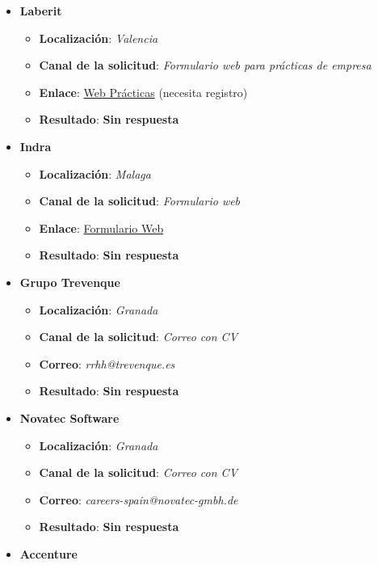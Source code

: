 \begin{itemize}
\begin{itemize}
	\end{itemize}
	\item \textbf{Laberit}
	\begin{itemize}
		\item \textbf{Localización}: \textit{Valencia}
		\item \textbf{Canal de la solicitud}: \textit{Formulario web para prácticas de empresa}
		\item \textbf{Enlace}: \href{https://careers.laberit.com/jobs/practicas-fct-2025}{Web Prácticas} (necesita registro)
		\item \textbf{Resultado}: {\color{orange} \textbf{Sin respuesta}}
	\end{itemize}
	\item \textbf{Indra}
	\begin{itemize}
		\item \textbf{Localización}: \textit{Malaga}
		\item \textbf{Canal de la solicitud}: \textit{Formulario web}
		\item \textbf{Enlace}: \href{https://www.indracompany.com/es/trabajar-indra-1}{Formulario Web}
		\item \textbf{Resultado}: {\color{orange} \textbf{Sin respuesta}}
	\end{itemize}
	\item \textbf{Grupo Trevenque}
	\begin{itemize}
		\item \textbf{Localización}: \textit{Granada}
		\item \textbf{Canal de la solicitud}: \textit{Correo con CV}
		\item \textbf{Correo}: \textit{rrhh@trevenque.es}
		\item \textbf{Resultado}: {\color{orange} \textbf{Sin respuesta}}
	\end{itemize}
	\item \textbf{Novatec Software}
	\begin{itemize}
		\item \textbf{Localización}: \textit{Granada}
		\item \textbf{Canal de la solicitud}: \textit{Correo con CV}
		\item \textbf{Correo}: \textit{careers-spain@novatec-gmbh.de}
		\item \textbf{Resultado}: {\color{orange} \textbf{Sin respuesta}}
	\end{itemize}
	\item \textbf{Accenture}
	\begin{itemize}

\end{itemize}
\end{itemize}
